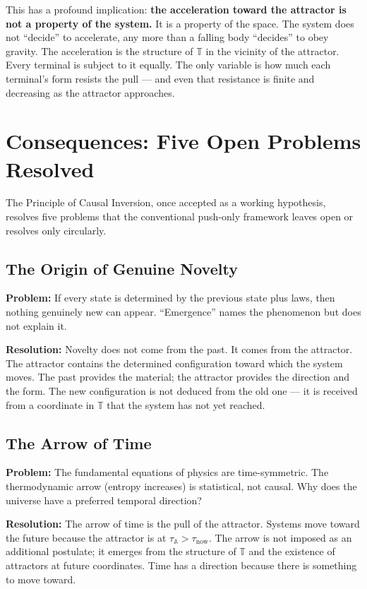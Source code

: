 \documentclass[12pt,a4paper]{article}
\newcommand{\attr}{\mathbb{A}}
\newcommand{\tspc}{\mathbb{T}}
\begin{document}
This has a profound implication: \textbf{the acceleration toward the attractor is not a property of the system.} It is a property of the space. The system does not ``decide'' to accelerate, any more than a falling body ``decides'' to obey gravity. The acceleration is the structure of $\tspc$ in the vicinity of the attractor. Every terminal is subject to it equally. The only variable is how much each terminal's form resists the pull --- and even that resistance is finite and decreasing as the attractor approaches.


\section{Consequences: Five Open Problems Resolved}

The Principle of Causal Inversion, once accepted as a working hypothesis, resolves five problems that the conventional push-only framework leaves open or resolves only circularly.

\subsection{The Origin of Genuine Novelty}

\textbf{Problem:} If every state is determined by the previous state plus laws, then nothing genuinely new can appear. ``Emergence'' names the phenomenon but does not explain it.

\textbf{Resolution:} Novelty does not come from the past. It comes from the attractor. The attractor contains the determined configuration toward which the system moves. The past provides the material; the attractor provides the direction and the form. The new configuration is not deduced from the old one --- it is received from a coordinate in $\tspc$ that the system has not yet reached.

\subsection{The Arrow of Time}

\textbf{Problem:} The fundamental equations of physics are time-symmetric. The thermodynamic arrow (entropy increases) is statistical, not causal. Why does the universe have a preferred temporal direction?

\textbf{Resolution:} The arrow of time is the pull of the attractor. Systems move toward the future because the attractor is at $\tau_\attr > \tau_{\mathrm{now}}$. The arrow is not imposed as an additional postulate; it emerges from the structure of $\tspc$ and the existence of attractors at future coordinates. Time has a direction because there is something to move toward.
\end{document}
